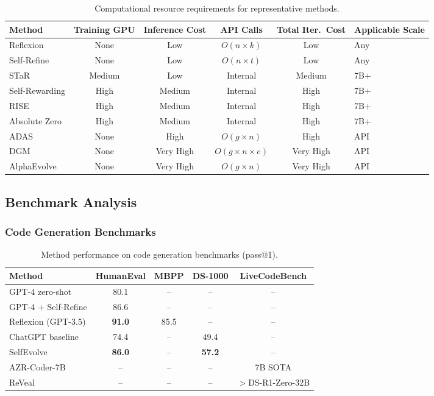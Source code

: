 \begin{table}[htbp]
\centering
\caption{Computational resource requirements for representative methods.}
\label{tab:compute-cost}
\begin{tabular}{lccccl}
\toprule
\textbf{Method} & \textbf{Training GPU} & \textbf{Inference Cost} & \textbf{API Calls} & \textbf{Total Iter.\ Cost} & \textbf{Applicable Scale} \\
\midrule
Reflexion & None & Low & $O(n \times k)$ & Low & Any \\
Self-Refine & None & Low & $O(n \times t)$ & Low & Any \\
STaR & Medium & Low & Internal & Medium & 7B+ \\
Self-Rewarding & High & Medium & Internal & High & 7B+ \\
RISE & High & Medium & Internal & High & 7B+ \\
Absolute Zero & High & Medium & Internal & High & 7B+ \\
ADAS & None & High & $O(g \times n)$ & High & API \\
DGM & None & Very High & $O(g \times n \times e)$ & Very High & API \\
AlphaEvolve & None & Very High & $O(g \times n)$ & Very High & API \\
\bottomrule
\end{tabular}
\end{table}

\subsection{Benchmark Analysis}\label{sec:benchmarks}

\subsubsection{Code Generation Benchmarks}

\begin{table}[htbp]
\centering
\caption{Method performance on code generation benchmarks (pass@1).}
\label{tab:code-benchmark}
\begin{tabular}{lcccc}
\toprule
\textbf{Method} & \textbf{HumanEval} & \textbf{MBPP} & \textbf{DS-1000} & \textbf{LiveCodeBench} \\
\midrule
GPT-4 zero-shot & 80.1 & -- & -- & -- \\
GPT-4 + Self-Refine & 86.6 & -- & -- & -- \\
Reflexion (GPT-3.5) & \textbf{91.0} & 85.5 & -- & -- \\
ChatGPT baseline & 74.4 & -- & 49.4 & -- \\
SelfEvolve & \textbf{86.0} & -- & \textbf{57.2} & -- \\
AZR-Coder-7B & -- & -- & -- & 7B SOTA \\
ReVeal & -- & -- & -- & $>$DS-R1-Zero-32B \\
\bottomrule
\end{tabular}
\end{table}


